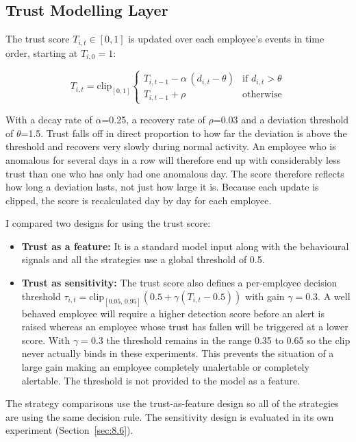 \documentclass[a4paper,12pt]{article}
\begin{document}
\subsection{Trust Modelling Layer}
\label{sec:6.4}

The trust score $T_{i,t} \in [0,1]$ is updated over each employee's events in time order, starting at $T_{i,0} = 1$:

\begin{equation}
T_{i,t} = \mathrm{clip}_{[0,1]}
\begin{cases}
T_{i,t-1} - \alpha\,(d_{i,t} - \theta) & \text{if } d_{i,t} > \theta \\
T_{i,t-1} + \rho & \text{otherwise}
\end{cases}
\end{equation}

With a decay rate of \emph{$\alpha$}=0.25, a recovery rate of \emph{$\rho$}=0.03 and a deviation threshold of \emph{$\theta$}=1.5. Trust falls off in direct proportion to how far the deviation is above the threshold and recovers very slowly during normal activity. An employee who is anomalous for several days in a row will therefore end up with considerably less trust than one who has only had one anomalous day. The score therefore reflects how long a deviation lasts, not just how large it is. Because each update is clipped, the score is recalculated day by day for each employee.

I compared two designs for using the trust score:

\begin{itemize}
  \item \textbf{Trust as a feature:} It is a standard model input along with the behavioural signals and all the strategies use a global threshold of 0.5.
  \item \textbf{Trust as sensitivity:} The trust score also defines a per-employee decision threshold $\tau_{i,t} = \mathrm{clip}_{[0.05,\,0.95]}\!\left(0.5 + \gamma (T_{i,t} - 0.5)\right)$ with gain $\gamma = 0.3$. A well behaved employee will require a higher detection score before an alert is raised whereas an employee whose trust has fallen will be triggered at a lower score. With $\gamma = 0.3$ the threshold remains in the range 0.35 to 0.65 so the clip never actually binds in these experiments. This prevents the situation of a large gain making an employee completely unalertable or completely alertable. The threshold is not provided to the model as a feature.
\end{itemize}
The strategy comparisons use the trust-as-feature design so all of the strategies are using the same decision rule. The sensitivity design is evaluated in its own experiment (Section~\ref{sec:8.6}).
\end{document}
